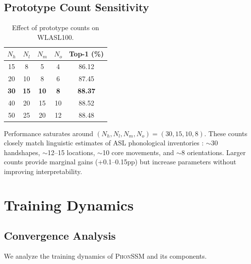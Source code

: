 \documentclass{article}
\newcommand{\phonssm}{\textsc{PhonSSM}}
\begin{document}
\subsection{Prototype Count Sensitivity}

\begin{table}[ht]
\caption{Effect of prototype counts on WLASL100.}
\label{tab:proto_sensitivity}
\vspace{-1mm}
\begin{center}
\begin{small}
\begin{tabular*}{\columnwidth}{@{\extracolsep{\fill}}ccccc@{}}
\toprule
$N_h$ & $N_l$ & $N_m$ & $N_o$ & Top-1 (\%) \\
\midrule
15 & 8 & 5 & 4 & 86.12 \\
20 & 10 & 8 & 6 & 87.45 \\
\textbf{30} & \textbf{15} & \textbf{10} & \textbf{8} & \textbf{88.37} \\
40 & 20 & 15 & 10 & 88.52 \\
50 & 25 & 20 & 12 & 88.48 \\
\bottomrule
\end{tabular*}
\end{small}
\end{center}
\vspace{-2mm}
\end{table}

Performance saturates around $(N_h, N_l, N_m, N_o) = (30, 15, 10, 8)$. These counts closely match linguistic estimates of ASL phonological inventories \citep{battison1978lexical}: $\sim$30 handshapes, $\sim$12--15 locations, $\sim$10 core movements, and $\sim$8 orientations. Larger counts provide marginal gains (+0.1--0.15pp) but increase parameters without improving interpretability.

\section{Training Dynamics}
\label{app:training}

\subsection{Convergence Analysis}

We analyze the training dynamics of \phonssm{} and its components.
\end{document}
